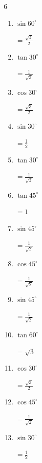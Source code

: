 \begin{multicols}{6}
\begin{enumerate}
  \item $\displaystyle \sin{60^\circ}$

        $\displaystyle =\frac{\sqrt{3}}{2}$

  \item $\displaystyle \tan{30^\circ}$

        $\displaystyle =\frac{1}{\sqrt{3}}$

  \item $\displaystyle \cos{30^\circ}$

        $\displaystyle =\frac{\sqrt{3}}{2}$

  \item $\displaystyle \sin{30^\circ}$

        $\displaystyle =\frac{1}{2}$

  \item $\displaystyle \tan{30^\circ}$

        $\displaystyle =\frac{1}{\sqrt{3}}$

  \item $\displaystyle \tan{45^\circ}$

        $\displaystyle =1$

  \item $\displaystyle \sin{45^\circ}$

        $\displaystyle =\frac{1}{\sqrt{2}}$

  \item $\displaystyle \cos{45^\circ}$

        $\displaystyle =\frac{1}{\sqrt{2}}$

  \item $\displaystyle \sin{45^\circ}$

        $\displaystyle =\frac{1}{\sqrt{2}}$

  \item $\displaystyle \tan{60^\circ}$

        $\displaystyle =\sqrt{3}$

  \item $\displaystyle \cos{30^\circ}$

        $\displaystyle =\frac{\sqrt{3}}{2}$

  \item $\displaystyle \cos{45^\circ}$

        $\displaystyle =\frac{1}{\sqrt{2}}$

  \item $\displaystyle \sin{30^\circ}$

        $\displaystyle =\frac{1}{2}$


\end{enumerate}
\end{multicols}

